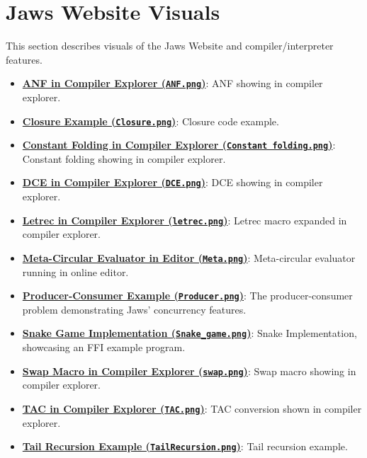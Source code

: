 \documentclass[final]{cmpreport_02}
\begin{document}
\section{Jaws Website Visuals}
\label{app:compiler-ex-visuals}
This section describes visuals of the Jaws Website and compiler/interpreter features. 
\begin{itemize}
    \item \textbf{\href{https://github.com/Jamie-Wales/Jaws/blob/main/assets/ANF.png}{ANF in Compiler Explorer (\texttt{ANF.png})}}: ANF showing in compiler explorer.
    \item \textbf{\href{https://github.com/Jamie-Wales/Jaws/blob/main/assets/closure.png}{Closure Example (\texttt{Closure.png})}}: Closure code example.
    \item \textbf{\href{https://github.com/Jamie-Wales/Jaws/blob/main/assets/Constant folding.png}{Constant Folding in Compiler Explorer (\texttt{Constant folding.png})}}: Constant folding showing in compiler explorer.
    \item \textbf{\href{https://github.com/Jamie-Wales/Jaws/blob/main/assets/dce.png}{DCE in Compiler Explorer (\texttt{DCE.png})}}: DCE showing in compiler explorer.
    \item \textbf{\href{https://github.com/Jamie-Wales/Jaws/blob/main/assets/letrec.png}{Letrec in Compiler Explorer (\texttt{letrec.png})}}: Letrec macro expanded in compiler explorer.
    \item \textbf{\href{https://github.com/Jamie-Wales/Jaws/blob/main/assets/Meta.png}{Meta-Circular Evaluator in Editor (\texttt{Meta.png})}}: Meta-circular evaluator running in online editor.
    \item \textbf{\href{https://github.com/Jamie-Wales/Jaws/blob/main/assets/Producer.png}{Producer-Consumer Example (\texttt{Producer.png})}}: The producer-consumer problem demonstrating Jaws' concurrency features.
    \item \textbf{\href{https://github.com/Jamie-Wales/Jaws/blob/main/assets/Snake_game.png}{Snake Game Implementation (\texttt{Snake\_game.png})}}: Snake Implementation, showcasing an FFI example program.
    \item \textbf{\href{https://github.com/Jamie-Wales/Jaws/blob/main/assets/swap.png}{Swap Macro in Compiler Explorer (\texttt{swap.png})}}: Swap macro showing in compiler explorer.
    \item \textbf{\href{https://github.com/Jamie-Wales/Jaws/blob/main/assets/TAC.png}{TAC in Compiler Explorer (\texttt{TAC.png})}}: TAC conversion shown in compiler explorer.
    \item \textbf{\href{https://github.com/Jamie-Wales/Jaws/blob/main/assets/Tailrecursion.png}{Tail Recursion Example (\texttt{TailRecursion.png})}}: Tail recursion example.
\end{itemize}
\end{document}
